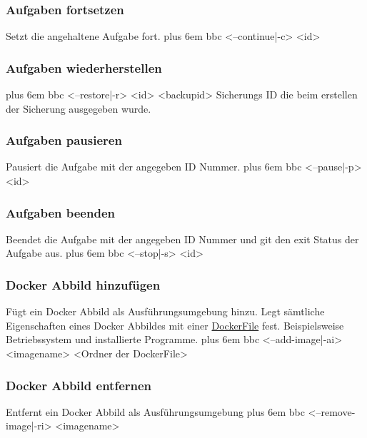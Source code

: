 \documentclass[a4paper,12pt]{article}
\makeatletter
\newenvironment{mycode}
 {\def\@xobeysp{\ }\verbatim\rightskip=0pt plus 6em\relax}
 {\endverbatim}
\makeatother
\begin{document}
\subsubsection{Aufgaben fortsetzen}
Setzt die angehaltene \gls{Aufgabe} fort.
\begin{mycode}
bbc <--continue|-c> <id>
\end{mycode}

\subsubsection{Aufgaben wiederherstellen}
\begin{mycode}
bbc <--restore|-r> <id> <backupid>
\end{mycode}
Sicherungs ID die beim erstellen der Sicherung ausgegeben wurde.

\subsubsection{Aufgaben pausieren}
Pausiert die \gls{Aufgabe} mit der angegeben ID Nummer.
\begin{mycode}
bbc <--pause|-p> <id>
\end{mycode}

\subsubsection{Aufgaben beenden}
Beendet die \gls{Aufgabe} mit der angegeben ID Nummer und git den exit Status der \gls{Aufgabe} aus.
\begin{mycode}
bbc <--stop|-s> <id>
\end{mycode}

\subsubsection{Docker Abbild hinzufügen}
Fügt ein \gls{Docker} Abbild als Ausführungsumgebung hinzu.
Legt sämtliche Eigenschaften eines \gls{Docker} Abbildes mit einer \href{https://docs.\gls{Docker}.com/engine/reference/builder/}{DockerFile} fest.
Beispielsweise Betriebssystem und installierte Programme. 
\begin{mycode}
bbc <--add-image|-ai> <imagename> <Ordner der \gls{Docker}File>
\end{mycode}

\subsubsection{Docker Abbild entfernen}
Entfernt ein \gls{Docker} Abbild als Ausführungsumgebung
\begin{mycode}
bbc <--remove-image|-ri> <imagename>
\end{mycode}
\end{document}

